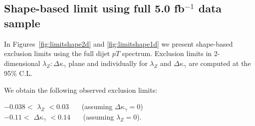 \subsection{Shape-based limit using full \texorpdfstring{5.0 fb${}^{-1}$}{5.0/fb} data sample}
In Figures~\ref{fig:limitshape2d} and \ref{fig:limitshape1d} we present
shape-based exclusion limits using the full dijet $pT$ spectrum.  Exclusion
limits in 2-dimensional $\lambda_Z:\Delta{\kappa_\gamma}$ plane and individually
for $\lambda_Z$ and $\Delta{\kappa_\gamma}$ are computed at the 95\% C.L.

We obtain the following observed exclusion limits:


\hspace*{6 mm} $ -0.038 < \, \, \lambda_Z \, \, < 0.03$  \, \, \, (assuming $\Delta{\kappa_\gamma}=0$) \\
\hspace*{6 mm} $ -0.11 < \, \, \Delta{\kappa_\gamma} \, \, < 0.14$  \, \, \, (assuming $\lambda_Z=0$).

